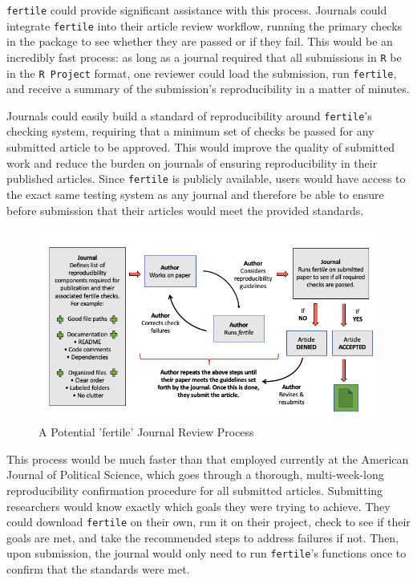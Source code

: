 \documentclass[12pt,twoside]{reedthesis}
\begin{document}
\texttt{fertile} could provide significant assistance with this process.
Journals could integrate \texttt{fertile} into their article review
workflow, running the primary checks in the package to see whether they
are passed or if they fail. This would be an incredibly fast process: as
long as a journal required that all submissions in \texttt{R} be in the
\texttt{R\ Project} format, one reviewer could load the submission, run
\texttt{fertile}, and receive a summary of the submission's
reproducibility in a matter of minutes.

Journals could easily build a standard of reproducibility around
\texttt{fertile}'s checking system, requiring that a minimum set of
checks be passed for any submitted article to be approved. This would
improve the quality of submitted work and reduce the burden on journals
of ensuring reproducibility in their published articles. Since
\texttt{fertile} is publicly available, users would have access to the
exact same testing system as any journal and therefore be able to ensure
before submission that their articles would meet the provided standards.
\begin{figure}
\includegraphics[width=1\linewidth]{figure/journal-process} \caption{A Potential 'fertile' Journal Review Process}\label{fig:unnamed-chunk-43}
\end{figure}
This process would be much faster than that employed currently at the
American Journal of Political Science, which goes through a thorough,
multi-week-long reproducibility confirmation procedure for all submitted
articles. Submitting researchers would know exactly which goals they
were trying to achieve. They could download \texttt{fertile} on their
own, run it on their project, check to see if their goals are met, and
take the recommended steps to address failures if not. Then, upon
submission, the journal would only need to run \texttt{fertile}'s
functions once to confirm that the standards were met.
\end{document}
